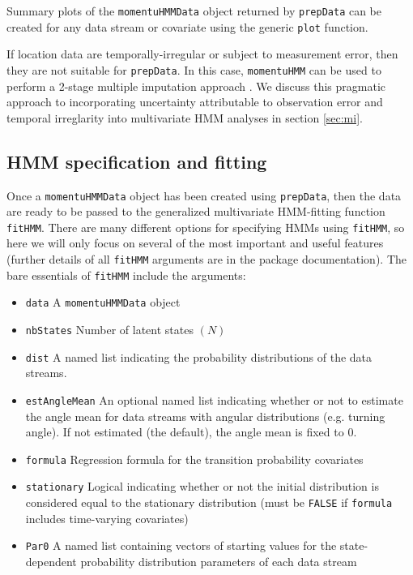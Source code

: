 \documentclass[12pt]{article}\usepackage[]{graphicx}\usepackage[]{color}
\begin{document}
Summary plots of the \verb|momentuHMMData| object returned by \verb|prepData| can be created for any data stream or covariate using the generic \verb|plot| function.

If location data are temporally-irregular or subject to measurement error, then they are not suitable for \verb|prepData|. In this case, \verb|momentuHMM| can be used to perform a 2-stage multiple imputation approach \citep{McClintock2017}. We discuss this pragmatic approach to incorporating uncertainty attributable to observation error and temporal irreglarity into multivariate HMM analyses in section \ref{sec:mi}.

\subsection{HMM specification and fitting}
Once a \verb|momentuHMMData| object has been created using \verb|prepData|, then the data are ready to be passed to the generalized multivariate HMM-fitting function \verb|fitHMM|. There are many different options for specifying HMMs using \verb|fitHMM|, so here we will only focus on several of the most important and useful features (further details of all \verb|fitHMM| arguments are in the package documentation). The bare essentials of \verb|fitHMM| include the arguments:
\begin{itemize}
  \item{\verb|data|} A \verb|momentuHMMData| object
  \item{\verb|nbStates|} Number of latent states $(N)$
  \item{\verb|dist|} A named list indicating the probability distributions of the data streams.
  \item{\verb|estAngleMean|} An optional named list indicating whether or not to estimate the angle mean for data streams with angular distributions (e.g. turning angle). If not estimated (the default), the angle mean is fixed to 0.
  \item{\verb|formula|} Regression formula for the transition probability covariates
  \item{\verb|stationary|} Logical indicating whether or not the initial distribution is considered equal to the stationary distribution (must be \verb|FALSE| if \verb|formula| includes time-varying covariates) 
  \item{\verb|Par0|} A named list containing vectors of starting values for the state-dependent probability distribution parameters of each data stream
\end{itemize}
\end{document}
